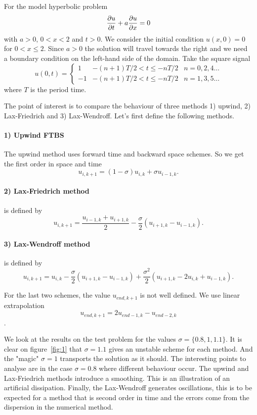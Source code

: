 
For the model hyperbolic problem 
\begin{equation}
\dfrac{\partial u}{\partial t}+a\dfrac{\partial u}{\partial x}=0
\end{equation}
with $a>0$, $0<x<2$ and $t>0$. We consider the initial condition $u(x,0)=0$ for $0<x\leq 2$. Since $a>0$ the solution will travel towards the right and we need a boundary condition on the left-hand side of the domain. Take the square signal 
$$
u(0,t)=\left\{\begin{array}{lcc}
1 & -(n+1)T/2<t\leq -nT/2 & n = 0,2,4\dots\\
-1 & -(n+1)T/2<t\leq -nT/2 & n = 1,3,5\dots
\end{array}\right.
$$
where $T$ is the period time.

The point of interest is to compare the behaviour of three methods 1) upwind, 2) Lax-Friedrich
and 3) Lax-Wendroff. Let's first define the following methods.

\paragraph*{1) Upwind FTBS} The upwind method uses forward time and backward space schemes. So we get the first order in space and time 
$$u_{i,k+1}=(1-\sigma)u_{i,k}+\sigma u_{i-1,k}.$$ 


\paragraph*{2) Lax-Friedrich method} is defined by 
$$u_{i,k+1} = \dfrac{u_{i-1,k}+u_{i+1,k}}{2}-\dfrac{\sigma}{2}(u_{i+1,k}-u_{i-1,k}).$$

\paragraph*{3) Lax-Wendroff method} is defined by 
$$u_{i,k+1} = u_{i,k} -\dfrac{\sigma}{2}(u_{i+1,k}-u_{i-1,k}) +\dfrac{\sigma^2}{2}(u_{i+1,k}-2u_{i,k}+u_{i-1,k}).$$

For the last two schemes, the value $u_{end,k+1}$ is not well defined. We use linear extrapolation $$u_{end,k+1} = 2u_{end-1,k}-u_{end-2,k}$$.

We look at the results on the test problem for the values $\sigma = \{0.8, 1, 1.1\}$. It is clear on figure~\ref{fig:1} that $\sigma=1.1$ gives an unstable scheme for each method. And the "magic" $\sigma=1$ transports the solution as it should. The interesting points to analyse are in the case $\sigma=0.8$ where different behaviour occur. The upwind and Lax-Friedrich methods introduce a smoothing. This is an illustration of an artificial dissipation. Finally, the Lax-Wendroff generates oscillations, this is to be expected for a method that is second order in time and the errors come from the dispersion in the numerical method.

